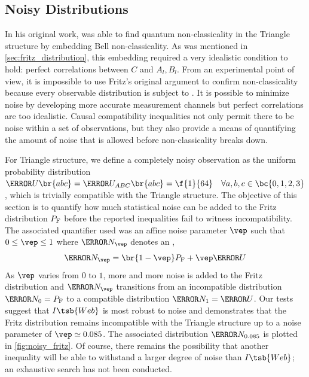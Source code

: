 \documentclass[aps, 10pt, english, twoside, pra, nofootinbib, tightenlines, longbibliography, superscriptaddress]{revtex4-1}
\begin{document}
    \subsection{Noisy Distributions}
    \label{sec:noise}
    In his original work, \citet{Fritz_2012} was able to find quantum non-classicality in the Triangle structure by embedding Bell non-classicality. As was mentioned in \cref{sec:fritz_distribution}, this embedding required a very idealistic condition to hold: perfect correlations between $C$ and $A_l, B_l$. From an experimental point of view, it is impossible to use Fritz's original argument to confirm non-classicality because every observable distribution is subject to . It is possible to minimize noise by developing more accurate measurement channels but perfect correlations are too idealistic. Causal compatibility inequalities not only permit there to be noise within a set of observations, but they also provide a means of quantifying the amount of noise that is allowed before non-classicality breaks down.

    For Triangle structure, we define a completely noisy observation as the uniform probability distribution $\s{U}\br{abc} = \s{U}_{ABC}\br{abc} = \f{1}{64} \quad \forall a,b,c\in \bc{0,1,2,3}$, which is trivially compatible with the Triangle structure. The objective of this section is to quantify how much statistical noise can be added to the Fritz distribution $\prob[\fritz]$ before the reported inequalities fail to witness incompatibility. The associated quantifier used was an affine noise parameter $\vep$ such that $0 \leq \vep \leq 1$ where $\s{N}_{\vep}$ denotes an ,
    \[ \s{N}_{\vep} = \br{1 - \vep} \prob[\fritz] + \vep \s{U} \]
    As $\vep$ varies from $0$ to $1$, more and more noise is added to the Fritz distribution and $\s{N}_{\vep}$ transitions from an incompatible distribution $\s{N}_{0} = \prob[\fritz]$ to a compatible distribution $\s{N}_{1} = \s{U}$. Our tests suggest that $I\tsb{Web}$ is most robust to noise and demonstrates that the Fritz distribution remains incompatible with the Triangle structure up to a noise parameter of $\vep \simeq 0.085$. The associated distribution $\s N_{0.085}$ is plotted in \cref{fig:noisy_fritz}. Of course, there remains the possibility that another inequality will be able to withstand a larger degree of noise than $I\tsb{Web}$; an exhaustive search has not been conducted.
\end{document}
